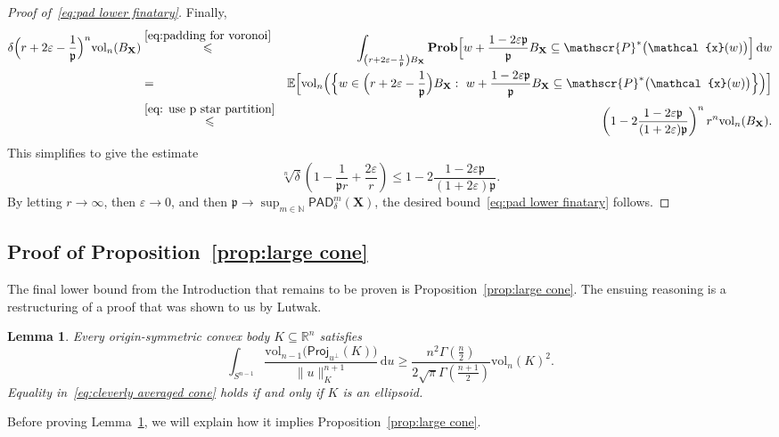 \documentclass[11pt,reqno]{amsart}
\renewcommand{\le}{\leqslant}
\renewcommand{\ge}{\geqslant}
\newcommand{\ud}[0]{\,\mathrm{d}}
\renewcommand{\d}{\delta}
\newcommand{\proj}{\mathsf{Proj}}
\newcommand{\X}{\mathbf X}
\newcommand{\e}{\varepsilon}
\newcommand{\R}{\mathbb R}
\newtheorem{lemma}[theorem]{Lemma}
\theoremstyle{remark}
\renewcommand{\subset}{\subseteq}
\newcommand{\E}{\mathbb{ E}}
\newcommand{\N}{\mathbb N}
\renewcommand{\Pr}{\mathbf{Prob}}
\newcommand{\vol}{\mathrm{vol}}
\renewcommand{\1}{\mathbf 1}
\newcommand{\Part}{\mathscr{P}}
\newcommand{\pad}{\mathsf{PAD}}
\newcommand{\p}{\mathfrak{p}}
\newcommand{\cx}{\mathcal{x}}
\begin{document}
\begin{proof}[Proof of~\eqref{eq:pad lower finatary}]
Finally,
\begin{eqnarray*}
\d\Big(r+2\e-\frac{1}{\mathfrak{p}}\Big)^n\vol_n(B_{\X})&\stackrel{\eqref{eq:padding for voronoi}}{\le} & \int_{\left(r+2\e-\frac{1}{\mathfrak{p}}\right)B_{\X}} \Pr\Big[w+\frac{1-2\e{\mathfrak{p}}}{{\mathfrak{p}}}B_{\X}\subset \Part^*\big(\cx(w)\big)\Big]\ud w\\
& =&\E\Big[\vol_n\Big(\Big\{w\in \Big(r+2\e-\frac{1}{\mathfrak{p}}\Big)B_{\X}:\  w+\frac{1-2\e{\mathfrak{p}}}{{\mathfrak{p}}}B_{\X}\subset \Part^*\big(\cx(w)\big)\Big\}\Big)\Big]\\&\stackrel{\eqref{eq: use p star partition}}{\le} & \left(1-2\frac{1-2\e{\mathfrak{p}}}{(1+2\e){\mathfrak{p}}}\right)^nr^n\vol_n(B_{\X}).
\end{eqnarray*}
This simplifies to give the estimate
$$
\sqrt[n]{\d}\left(1-\frac{1}{\p r}+\frac{2\e}{r}\right)\le 1-2\frac{1-2\e{\mathfrak{p}}}{(1+2\e){\mathfrak{p}}}.
$$
By letting $r\to \infty$, then $\e\to 0$, and then ${\mathfrak{p}}\to\sup_{m\in \N} \pad^m_\d(\X)$, the desired bound~\eqref{eq:pad lower finatary} follows.\end{proof}





\subsection{Proof of Proposition~\ref{prop:large cone}}\label{sec:erwin}



The final lower bound from the Introduction that remains to be proven is Proposition~\ref{prop:large cone}. The ensuing reasoning is a restructuring of a proof that was shown to us by Lutwak.




\begin{lemma}\label{lem:cone inequality} Every origin-symmetric convex body $K\subset \R^n$ satisfies
\begin{equation}\label{eq:cleverly averaged cone}
\int_{S^{n-1}} \frac{\vol_{n-1}\big(\proj_{u^\perp}(K)\big)}{\|u\|_K^{n+1}}\ud u\ge \frac{n^2\Gamma\left(\frac{n}{2}\right)}{2\sqrt{\pi}\Gamma\left(\frac{n+1}{2}\right)}\vol_n(K)^2.
\end{equation}
Equality in~\eqref{eq:cleverly averaged cone} holds if and only if $K$ is an ellipsoid.
\end{lemma}
Before proving Lemma~\ref{lem:cone inequality}, we will explain how it implies  Proposition~\ref{prop:large cone}.
\end{document}
